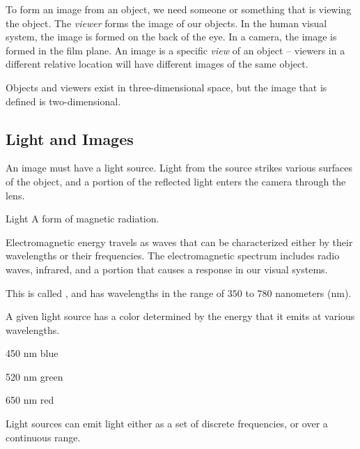 \documentclass[../COS3712_Notes.tex]{subfiles}
\begin{document}
        To form an image from an object, we need someone or something that is viewing the object.
        The \emph{viewer} forms the image of our objects.
        In the human visual system, the image is formed on the back of the eye.
        In a camera, the image is formed in the film plane.
        An image is a specific \emph{view} of an object -- viewers in a different relative
        location will have different images of the same object.

        Objects and viewers exist in three-dimensional space,
        but the image that is defined is two-dimensional.

      \subsection{Light and Images}
        An image must have a light source.
        Light from the source strikes various surfaces of the object,
        and a portion of the reflected light enters the camera through the lens.

        \begin{definition}{Light}
          A form of magnetic radiation.

          Electromagnetic energy travels as waves that can be characterized either by
          their wavelengths or their frequencies.
          The electromagnetic spectrum includes radio waves, infrared, and a portion that
          causes a response in our visual systems.

          This  is called ,
          and has wavelengths in the range of $350$ to $780$ nanometers (nm).

          A given light source has a color determined by the energy that it emits at various
          wavelengths.

          \begin{indentparagraph}
            \begin{descriptimize}[nosep]
              \item[450 nm] blue
              \item[520 nm] green
              \item[650 nm] red
            \end{descriptimize}
          \end{indentparagraph}
        \end{definition}

        Light sources can emit light either as a set of discrete frequencies,
        or over a continuous range.
\end{document}
